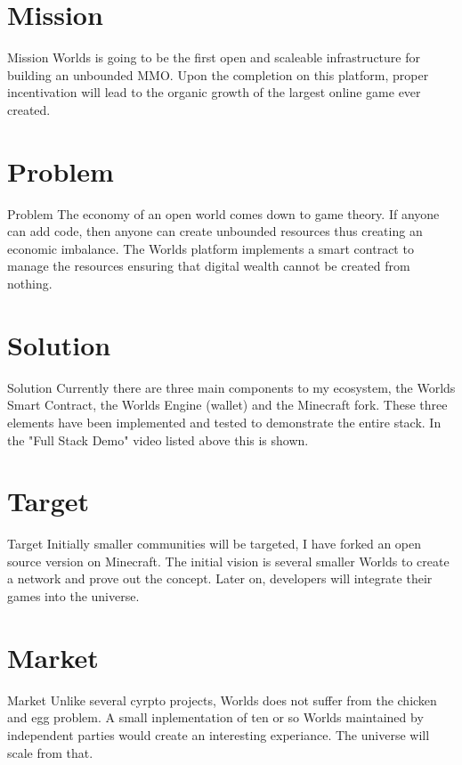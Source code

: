 \documentclass[final, ngerman, xcolor=pdftex, dvipsnames, table, aspectratio=169, 14pt]{beamer}
\begin{document}
\section{Mission}
\begin{frame}{Mission}
Worlds is going to be the first open and scaleable infrastructure for building an unbounded MMO. Upon the completion on this platform, proper incentivation will lead to the organic growth of the largest online game ever created.
\end{frame}

\section{Problem}
\begin{frame}{Problem}
The economy of an open world comes down to game theory. If anyone can add code, then anyone can create unbounded resources thus creating an economic imbalance. The Worlds platform implements a smart contract to manage the resources ensuring that digital wealth cannot be created from nothing.  
\end{frame}

\section{Solution}
\begin{frame}{Solution}
Currently there are three main components to my ecosystem, the Worlds Smart Contract, the Worlds Engine (wallet) and the Minecraft fork. These three elements have been implemented and tested to demonstrate the entire stack. In the "Full Stack Demo" video listed above this is shown.
\end{frame}

\section{Target}
\begin{frame}{Target}
Initially smaller communities will be targeted, I have forked an open source version on Minecraft. The initial vision is several smaller Worlds to create a network and prove out the concept. Later on, developers will integrate their games into the universe.
\end{frame}

\section{Market}
\begin{frame}{Market}
Unlike several cyrpto projects, Worlds does not suffer from the chicken and egg problem. A small inplementation of ten or so Worlds maintained by independent parties would create an interesting experiance. The universe will scale from that.
\end{frame}
\end{document}
